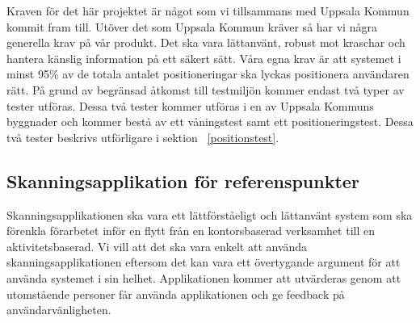 \documentclass[a4paper,12pt]{article}
\begin{document}

 Kraven för det här projektet är något som vi tillsammans med Uppsala Kommun kommit fram till. Utöver det som Uppsala Kommun kräver så har vi några generella krav på vår produkt. Det ska vara lättanvänt, robust mot kraschar och hantera känslig information på ett säkert sätt. Våra egna krav är att systemet i minst 95\% av de totala antalet positioneringar ska lyckas positionera användaren rätt. På grund av begränsad åtkomst till testmiljön kommer endast två typer av tester utföras. Dessa två tester kommer utföras i en av Uppsala Kommuns byggnader och kommer bestå av ett våningstest samt ett positioneringstest. Dessa två tester beskrivs utförligare i sektion ~\ref{positionstest}.

 \subsection{Skanningsapplikation för referenspunkter}
 Skanningsapplikationen ska vara ett lättförståeligt och lättanvänt system som ska förenkla förarbetet inför en flytt från en kontorsbaserad verksamhet till en aktivitetsbaserad. Vi vill att det ska vara enkelt att använda skanningsapplikationen eftersom det kan vara ett övertygande argument för att använda systemet i sin helhet. Applikationen kommer att utvärderas genom att utomstående personer får använda applikationen och ge feedback på användarvänligheten.
\end{document}
